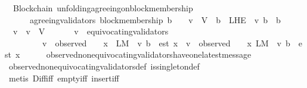 \begin{isabellebody}
\isanewline
\isanewline
{}\isamarkupfalse%
\ {\isacharparenleft}\ Blockchain{\isacharparenright}\ unfolding{\isacharunderscore}agreeing{\isacharunderscore}on{\isacharunderscore}block{\isacharunderscore}membership\ {\isacharcolon}\isanewline
\ \ {\isachardoublequoteopen}{\isasymforall}\ {\isasymsigma}\ {\isasymin}\ {\isasymSigma}{\isachardot}\ agreeing{\isacharunderscore}validators\ {\isacharparenleft}block{\isacharunderscore}membership\ b{\isacharcomma}\ {\isasymsigma}{\isacharparenright}\ {\isacharequal}\ \ {\isacharbraceleft}v\ {\isasymin}\ V{\isachardot}\ {\isasymexists}\ b{\isacharprime}\ {\isasymin}\ L{\isacharunderscore}H{\isacharunderscore}E\ {\isasymsigma}\ v{\isachardot}\ b\ {\isasymdownharpoonright}\ b{\isacharprime}{\isacharbraceright}{\isachardoublequoteclose}\isanewline
%
\isadelimproof
%
\endisadelimproof
%
\isatagproof
{}\isamarkupfalse%
\ {\isacharminus}\isanewline
\ \ \isamarkupfalse%
\ {\isachardoublequoteopen}{\isasymforall}\ v\ {\isasymsigma}{\isachardot}\ v\ {\isasymin}\ V\ {\isasymand}\ {\isasymsigma}\ {\isasymin}\ {\isasymSigma}\ {\isasymlongrightarrow}\ \ v\ {\isasymnotin}\ equivocating{\isacharunderscore}validators\ {\isasymsigma}\ \isanewline
\ \ \ \ \ \ \ \ {\isasymlongrightarrow}\ {\isacharparenleft}v\ {\isasymin}\ observed\ {\isasymsigma}\ {\isasymand}\ {\isacharparenleft}{\isasymforall}\ x\ {\isasymin}\ L{\isacharunderscore}M\ {\isasymsigma}\ v{\isachardot}\ b\ {\isasymdownharpoonright}\ est\ x{\isacharparenright}{\isacharparenright}\ {\isacharequal}\ {\isacharparenleft}v\ {\isasymin}\ observed\ {\isasymsigma}\ {\isasymand}\ {\isacharparenleft}{\isasymexists}\ x\ {\isasymin}L{\isacharunderscore}M\ {\isasymsigma}\ v{\isachardot}\ b\ {\isasymdownharpoonright}\ est\ x{\isacharparenright}{\isacharparenright}{\isachardoublequoteclose}\isanewline
\ \ \ \ \isamarkupfalse%
\ observed{\isacharunderscore}non{\isacharunderscore}equivocating{\isacharunderscore}validators{\isacharunderscore}have{\isacharunderscore}one{\isacharunderscore}latest{\isacharunderscore}message\isanewline
\ \ \ \ \isamarkupfalse%
\ observed{\isacharunderscore}non{\isacharunderscore}equivocating{\isacharunderscore}validators{\isacharunderscore}def\ is{\isacharunderscore}singleton{\isacharunderscore}def\isanewline
\ \ \ \ \isamarkupfalse%
\ {\isacharparenleft}metis\ Diff{\isacharunderscore}iff\ empty{\isacharunderscore}iff\ insert{\isacharunderscore}iff{\isacharparenright}\isanewline
\ \ \isamarkupfalse%
\ \isamarkupfalse%

\end{isabellebody}
